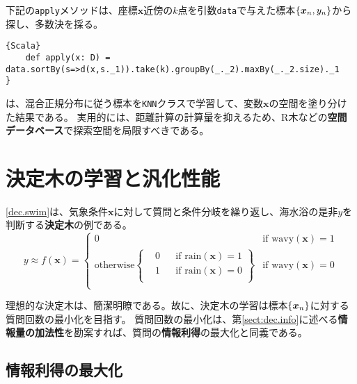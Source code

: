 \documentclass[10pt,a4paper]{book}
\begin{document}
下記の\texttt{apply}メソッドは、座標$\bm{x}$近傍の$k$点を引数\texttt{data}で与えた標本$\seq{\bm{x}_n,y_n}$から探し、多数決を採る。

\begin{Verbatim}{Scala}
	def apply(x: D) = data.sortBy(s=>d(x,s._1)).take(k).groupBy(_._2).maxBy(_._2.size)._1
}
\end{Verbatim}

は、混合正規分布に従う標本を\texttt{KNN}クラスで学習して、変数$\bm{x}$の空間を塗り分けた結果である。
実用的には、距離計算の計算量を抑えるため、R木などの\textbf{空間データベース}で探索空間を局限すべきである。

\chapter{決定木の学習と汎化性能\label{chap:dec}}

\eqref{dec.swim}は、気象条件$\bm{x}$に対して質問と条件分岐を繰り返し、海水浴の是非$y$を判断する\textbf{決定木}の例である。
%
\begin{equation}
\label{eq:dec.swim}
y \approx f(\bm{x}) = \begin{cases}
0 & \text{if $\mathrm{wavy}(\bm{x}) = 1$} \\
\text{otherwise}
\left\{
\begin{aligned}
& 0 && \text{if $\mathrm{rain}(\bm{x}) = 1$} \\
& 1 && \text{if $\mathrm{rain}(\bm{x}) = 0$} \\
\end{aligned}
\right\}
& \text{if $\mathrm{wavy}(\bm{x}) = 0$} \\
\end{cases}
\end{equation}

理想的な決定木は、簡潔明瞭である。故に、決定木の学習は標本$\seq{\bm{x}_n}$に対する質問回数の最小化を目指す。
質問回数の最小化は、第\ref{sect:dec.info}に述べる\textbf{情報量の加法性}を勘案すれば、質問の\textbf{情報利得}の最大化と同義である。

\section{情報利得の最大化\label{sect:dec.info}}
\end{document}
